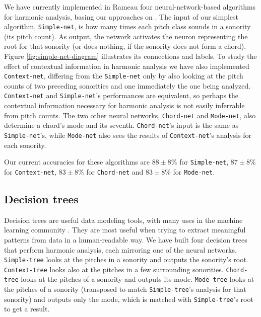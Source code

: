 \documentclass{article}
\begin{document}
We have currently implemented in Rameau four neural-network-based
algorithms for harmonic analysis, basing our approaches on
\cite{tsui:harmonic}. The input of our simplest algorithm,
\texttt{Simple-net}, is how many times each pitch class sounds in
a sonority (its pitch count). As output, the network activates the
neuron representing the root for that sonority (or does nothing, if
the sonority does not form a chord). Figure
\ref{fig:simple-net-diagram} illustrates its connections and labels.
To study the effect of contextual information in harmonic analysis we
have also implemented \texttt{Context-net}, differing from the
\texttt{Simple-net} only by also looking at the pitch counts of
two preceding sonorities and one immediately the one being analyzed.
\texttt{Context-net} and \texttt{Simple-net}'s performances are
equivalent, so perhaps the contextual information necessary for
harmonic analysis is not easily inferrable from pitch counts. The two
other neural networks, \texttt{Chord-net} and \texttt{Mode-net}, also
determine a chord's mode and its seventh. \texttt{Chord-net}'s input
is the same as \texttt{Simple-net}'s, while \texttt{Mode-net} also
sees the results of \texttt{Context-net}'s analysis for each sonority.

Our current accuracies for these algorithms are $88\pm 8\%$ for
\texttt{Simple-net}, $87 \pm 8\%$ for \texttt{Context-net}, $83 \pm
8\%$ for \texttt{Chord-net} and $83 \pm 8\%$ for \texttt{Mode-net}.

\subsection{Decision trees}
\label{sec:decision-trees}

Decision trees are useful data modeling tools, with many uses in the
machine learning community \cite{mitchell:machine,
  russell.ea:artificial}. They are most useful when trying to extract
meaningful patterns from data in a human-readable way. We have built
four decision trees that perform harmonic analysis, each mirroring one
of the neural networks. \texttt{Simple-tree} looks at the pitches in a
sonority and outputs the sonority's root. \texttt{Context-tree} looks
also at the pitches in a few surrounding
sonorities. \texttt{Chord-tree} looks at the pitches of a sonority and
outputs its mode. \texttt{Mode-tree} looks at the pitches of a
sonority (transposed to match \texttt{Simple-tree}'s analysis for that
sonority) and outputs only the mode, which is matched with
\texttt{Simple-tree}'s root to get a result.
\end{document}

